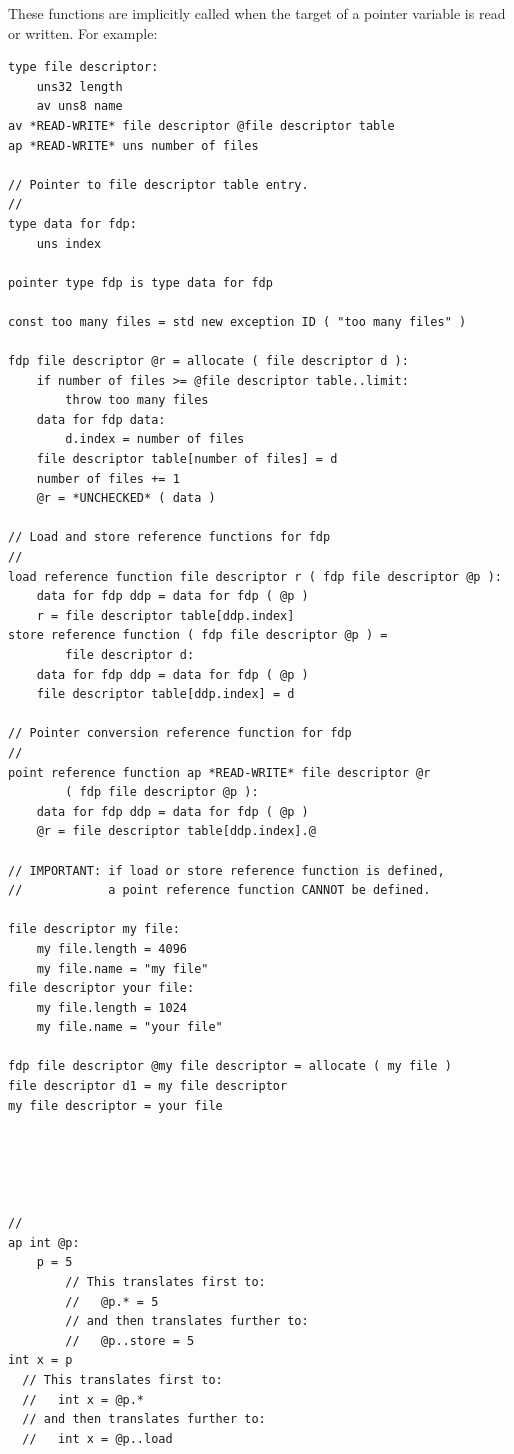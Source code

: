 \documentclass[12pt]{article}
\newenvironment{indpar}[1][0.3in]%
	{\begin{list}{}%
		     {\setlength{\itemsep}{0in}%
		      \setlength{\topsep}{0in}%
		      \setlength{\parsep}{1ex}%
		      \setlength{\labelwidth}{#1}%
		      \setlength{\leftmargin}{#1}%
		      \addtolength{\leftmargin}{\labelsep}}%
	 \item}%
	{\end{list}}
\begin{document}
These functions are implicitly called when the target
of a pointer variable is read or written.  For example:
\begin{indpar}\begin{verbatim}
type file descriptor:
    uns32 length
    av uns8 name 
av *READ-WRITE* file descriptor @file descriptor table
ap *READ-WRITE* uns number of files

// Pointer to file descriptor table entry.
//
type data for fdp:
    uns index

pointer type fdp is type data for fdp

const too many files = std new exception ID ( "too many files" )

fdp file descriptor @r = allocate ( file descriptor d ):
    if number of files >= @file descriptor table..limit:
        throw too many files
    data for fdp data:
        d.index = number of files
    file descriptor table[number of files] = d
    number of files += 1
    @r = *UNCHECKED* ( data )

// Load and store reference functions for fdp
//
load reference function file descriptor r ( fdp file descriptor @p ):
    data for fdp ddp = data for fdp ( @p )
    r = file descriptor table[ddp.index]
store reference function ( fdp file descriptor @p ) =
        file descriptor d:
    data for fdp ddp = data for fdp ( @p )
    file descriptor table[ddp.index] = d

// Pointer conversion reference function for fdp
//
point reference function ap *READ-WRITE* file descriptor @r
        ( fdp file descriptor @p ):
    data for fdp ddp = data for fdp ( @p )
    @r = file descriptor table[ddp.index].@

// IMPORTANT: if load or store reference function is defined,
//            a point reference function CANNOT be defined.

file descriptor my file:
    my file.length = 4096
    my file.name = "my file"
file descriptor your file:
    my file.length = 1024
    my file.name = "your file"

fdp file descriptor @my file descriptor = allocate ( my file )
file descriptor d1 = my file descriptor
my file descriptor = your file
    




//
ap int @p:
    p = 5
        // This translates first to:
        //   @p.* = 5
        // and then translates further to:
        //   @p..store = 5
int x = p
  // This translates first to:
  //   int x = @p.*
  // and then translates further to:
  //   int x = @p..load
\end{verbatim}\end{indpar}
\end{document}
